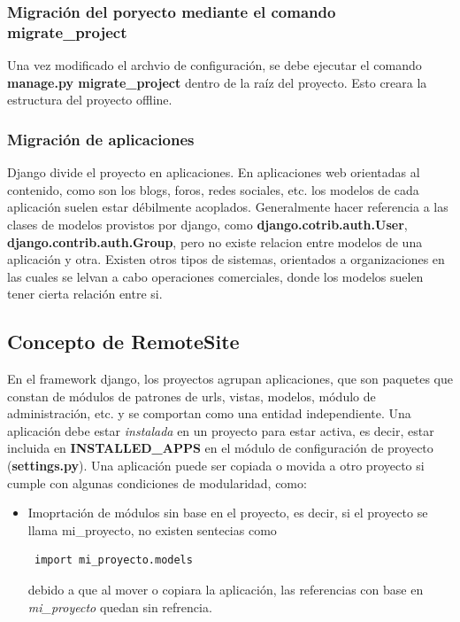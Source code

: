 \documentclass[a4paper]{report}
\begin{document}
\subsubsection{Migración del poryecto mediante el comando migrate\_project}
Una vez modificado el archvio de configuración, se debe ejecutar el comando
\textbf{manage.py migrate\_project} dentro de la raíz del proyecto. Esto creara
la estructura del proyecto offline.

\subsubsection{Migración de aplicaciones}
Django divide el proyecto en aplicaciones. En aplicaciones web orientadas al
contenido, como son los blogs, foros, redes sociales, etc. los modelos de cada
aplicación suelen estar débilmente acoplados.
Generalmente hacer referencia a las clases de modelos provistos por django,
como \textbf{django.cotrib.auth.User}, \textbf{django.contrib.auth.Group}, pero
no existe relacion entre modelos de una aplicación y otra.
Existen otros tipos de sistemas, orientados a organizaciones en las cuales se
lelvan a cabo operaciones comerciales, donde los modelos suelen tener cierta
relación entre si.


 

\subsection{Concepto de RemoteSite}
En el framework django, los proyectos agrupan aplicaciones, que son paquetes
que constan de módulos de patrones de urls, vistas, modelos, módulo de
administración, etc. y se comportan como una entidad independiente. Una
aplicación debe estar \textit{instalada} en un proyecto para estar activa, es
decir, estar incluida en \textbf{INSTALLED\_APPS} en el módulo de configuración
de proyecto (\textbf{settings.py}). Una aplicación puede ser copiada o movida a
otro proyecto si cumple con algunas condiciones de modularidad, como:
\begin{itemize}
  \item {Imoprtación de módulos sin base en el proyecto, es decir, si el
  proyecto se llama mi\_proyecto, no existen sentecias como
  \begin{verbatim} import mi_proyecto.models \end{verbatim}
   debido a que al mover o copiara la aplicación, las referencias con base en
  \textit{mi\_proyecto} quedan sin refrencia.}
\end{itemize}
\end{document}
